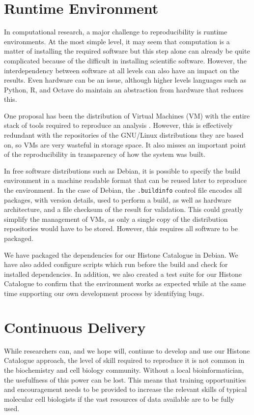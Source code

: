\section{Runtime Environment}

In computational research, a major challenge to
reproducibility is
runtime environments.  At the most simple level, it may seem that
computation is a
matter of installing the required software but this step alone can
already be quite complicated because of the difficult in installing
scientific software.
However, the
interdependency between software at all levels can also have an impact on
the results.  Even hardware can be an issue, although higher levels
languages such as Python, R, and Octave do maintain an abstraction from
hardware that reduces this.

One proposal has been the distribution of Virtual Machines (VM) with
the entire stack of tools required to reproduce an
analysis \citep{hurley2015virtual, angiuoli2011clovr}.
However, this is effectively redundant with
the repositories of the GNU/Linux distributions they are based on, so VMs
are very wasteful in storage space.  It also misses an important point of
the reproducibility in transparency of how the system was built.

In free software distributions such as Debian, it is possible to
specify the build environment in a machine readable format that can be
reused later to reproduce the environment.  In the case of Debian,
the \texttt{.buildinfo} control file encodes all packages, with
version details, used to perform a build, as well as hardware
architecture, and a file checksum of the result for validation.  This
could greatly simplify the management of VMs, as only a single
copy of the distribution repositories would have to be stored.
However, this requires all software to be packaged.

We have packaged the dependencies for our Histone
Catalogue in Debian.  We have also added configure scripts which run
before the build and check for installed dependencies.  In addition,
we also created a test suite for our Histone Catalogue to confirm that
the environment works as expected while at the same time supporting our own
development process by identifying bugs.

\section{Continuous Delivery}

While researchers can, and we hope will, continue to develop and use our
Histone Catalogue approach, the level of skill required to reproduce it is not
common in the biochemistry and cell biology community.
Without a local bioinformatician, the
usefulfness of this power can be lost.  This means that training
opportunities and encouragement needs to be provided to increase the
relevant skills of typical molecular cell biologists if the vast
resources of data available are to be fully used.

